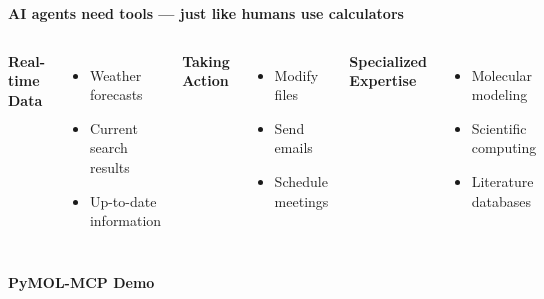 \documentclass[aspectratio=169]{beamer}
\begin{document}
\begin{frame}

\vspace{0.5cm}
\centering
\Large
\textbf{AI agents need tools — just like humans use calculators}

\vspace{1cm}

\begin{columns}[t]

\centering
\textbf{\large Real-time Data}
\vspace{0.4cm}

\normalsize
\begin{itemize}
\item Weather forecasts
\item Current search results
\item Up-to-date information
\end{itemize}

\centering
\textbf{\large Taking Action}
\vspace{0.4cm}

\normalsize
\begin{itemize}
\item Modify files
\item Send emails
\item Schedule meetings
\end{itemize}

\centering
\textbf{\large Specialized Expertise}
\vspace{0.4cm}

\normalsize
\begin{itemize}
\item Molecular modeling
\item Scientific computing
\item Literature databases
\end{itemize}

\end{columns}

\end{frame}

\begin{frame}

\vspace{2cm}
\centering
\Huge
\textbf{PyMOL-MCP Demo}

\end{frame}
\end{document}
